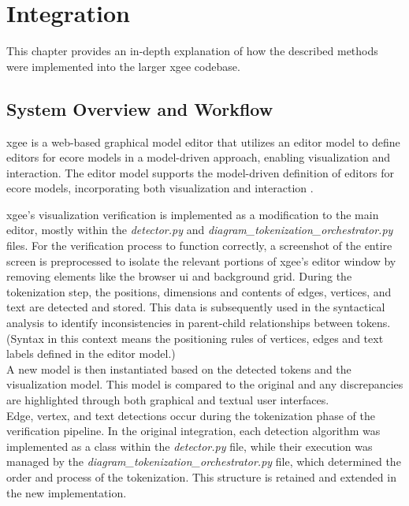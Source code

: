\chapter{Integration}
\label{chap:Integration}
This chapter provides an in-depth explanation of how the described methods were implemented into the larger \acrshort{xgee} codebase.

\section{System Overview and Workflow}
\label{sec:system_overview}

\acrshort{xgee} is a web-based graphical model editor that utilizes an editor model to define editors for ecore models in a model-driven approach, enabling visualization and interaction. The editor model supports the model-driven definition of editors for ecore models, incorporating both visualization and interaction \cite{waldvogel_annighoefer_models_2024}.

\acrshort{xgee}'s visualization verification is implemented as a modification to the main editor, mostly within the \textit{detector.py} and \textit{diagram\_tokenization\_orchestrator.py} files.
For the verification process to function correctly, a screenshot of the entire screen is preprocessed to isolate the relevant portions of \acrshort{xgee}'s editor window by removing elements like the browser \acrshort{ui} and background grid. During the tokenization step, the positions, dimensions and contents of edges, vertices, and text are detected and stored. This data is subsequently used in the syntactical analysis to identify inconsistencies in parent-child relationships between tokens. (Syntax in this context means the positioning rules of vertices, edges and text labels defined in the editor model.)\\
A new model is then instantiated based on the detected tokens and the visualization model. This model is compared to the original and any discrepancies are highlighted through both graphical and textual user interfaces.\\
Edge, vertex, and text detections occur during the tokenization phase of the verification pipeline. In the original integration, each detection algorithm was implemented as a class within the \textit{detector.py} file, while their execution was managed by the \textit{diagram\_tokenization\_orchestrator.py} file, which determined the order and process of the tokenization. This structure is retained and extended in the new implementation.

